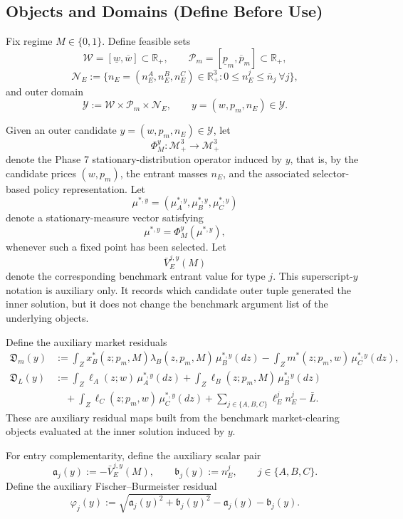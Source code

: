 \subsection{Objects and Domains (Define Before Use)}

Fix regime $M\in\{0,1\}$. Define feasible sets
\[
\mathcal W=[\underline w,\overline w]\subset\mathbb R_+,
\qquad
\mathcal P_m=[\underline p_m,\overline p_m]\subset\mathbb R_+,
\]
\[
\mathcal N_E:=\{n_E=(n_E^A,n_E^B,n_E^C)\in\mathbb R_+^3:0\le n_E^j\le\overline n_j\ \forall j\},
\]
and outer domain
\[
\mathcal Y:=\mathcal W\times\mathcal P_m\times\mathcal N_E,
\qquad
y=(w,p_m,n_E)\in\mathcal Y.
\]

Given an outer candidate $y=(w,p_m,n_E)\in\mathcal Y$, let
\[
\Phi_M^y:\mathcal M_+^3\to\mathcal M_+^3
\]
denote the Phase 7 stationary-distribution operator induced by $y$, that is, by the candidate prices $(w,p_m)$, the entrant masses $n_E$, and the associated selector-based policy representation. Let
\[
\mu^{*,y}=(\mu_A^{*,y},\mu_B^{*,y},\mu_C^{*,y})
\]
denote a stationary-measure vector satisfying
\[
\mu^{*,y}=\Phi_M^y(\mu^{*,y}),
\]
whenever such a fixed point has been selected. Let
\[
\bar V_E^{j,y}(M)
\]
denote the corresponding benchmark entrant value for type $j$. This superscript-$y$ notation is auxiliary only. It records which candidate outer tuple generated the inner solution, but it does not change the benchmark argument list of the underlying objects.

Define the auxiliary market residuals
\begin{align}
\mathfrak D_m(y)
&:=
\int_Z x_B^*(z;p_m,M)\lambda_B(z,p_m,M)\,\mu_B^{*,y}(dz)
-
\int_Z m^*(z;p_m,w)\,\mu_C^{*,y}(dz),
\label{eq:p8_Dm_resid}\\
\mathfrak D_L(y)
&:=
\int_Z \ell_A(z;w)\,\mu_A^{*,y}(dz)
+\int_Z \ell_B(z;p_m,M)\,\mu_B^{*,y}(dz)
\nonumber\\
&\quad+\int_Z \ell_C(z;p_m,w)\,\mu_C^{*,y}(dz)
+\sum_{j\in\{A,B,C\}}\ell_E^j n_E^j
-\bar L.
\label{eq:p8_DL_resid}
\end{align}
These are auxiliary residual maps built from the benchmark market-clearing objects evaluated at the inner solution induced by $y$.

For entry complementarity, define the auxiliary scalar pair
\[
\mathfrak a_j(y):=-\bar V_E^{j,y}(M),
\qquad
\mathfrak b_j(y):=n_E^j,
\qquad j\in\{A,B,C\}.
\]
Define the auxiliary Fischer--Burmeister residual
\begin{equation}
\varphi_j(y):=\sqrt{\mathfrak a_j(y)^2+\mathfrak b_j(y)^2}-\mathfrak a_j(y)-\mathfrak b_j(y).
\label{eq:p8_fb}
\end{equation}

